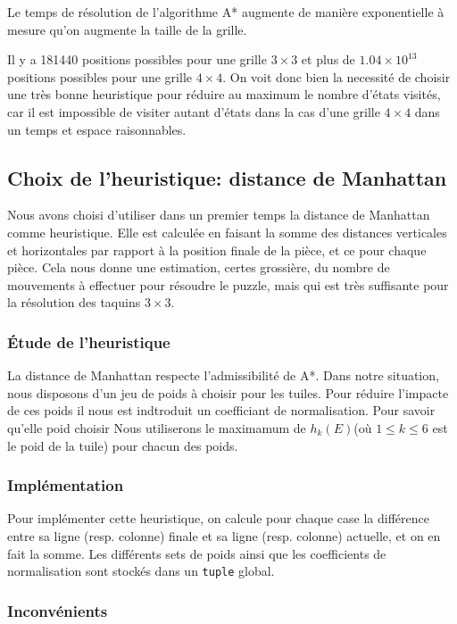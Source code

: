 \documentclass[a4paper, 12pt]{article}
\begin{document}
Le temps de résolution de l'algorithme A* augmente de manière exponentielle à mesure qu'on augmente la taille de la grille.

Il y a 181440 positions possibles pour une grille $3 \times 3$ et plus de $1.04 \times 10^{13}$ positions possibles pour une grille $4 \times 4$.
On voit donc bien la necessité de choisir une très bonne heuristique pour réduire au maximum le nombre d'états visités, car il est impossible de visiter autant d'états dans la cas d'une grille $4 \times 4$ dans un temps et espace raisonnables.

\subsection{Choix de l'heuristique: distance de Manhattan}

Nous avons choisi d'utiliser dans un premier temps la distance de Manhattan comme heuristique. Elle est calculée en faisant la somme des distances verticales et horizontales par rapport à la position finale de la pièce, et ce pour chaque pièce.
Cela nous donne une estimation, certes grossière, du nombre de mouvements à effectuer pour résoudre le puzzle, mais qui est très suffisante pour la résolution des taquins $3 \times 3$.

\subsubsection{Étude de l'heuristique}
La distance de Manhattan respecte l'admissibilité de A*. Dans notre situation, nous disposons d'un jeu de poids à choisir pour les tuiles. Pour réduire l'impacte de ces poids il nous est indtroduit un coefficiant de normalisation. Pour savoir qu'elle poid choisir Nous utiliserons le maximamum de $h_{k}(E)$(où $1 \leq k \leq 6$ est le poid de la tuile) pour chacun des poids.

\subsubsection{Implémentation}

Pour implémenter cette heuristique, on calcule pour chaque case la différence entre sa ligne (resp. colonne) finale et sa ligne (resp. colonne) actuelle, et on en fait la somme.
Les différents sets de poids ainsi que les coefficients de normalisation sont stockés dans un \lstinline{tuple} global.

\subsubsection{Inconvénients}
\end{document}
